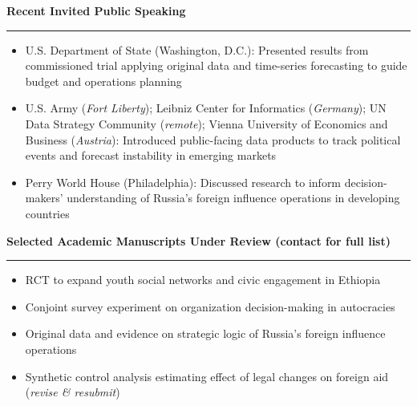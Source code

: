 \documentclass[11pt]{article}
\begin{document}

\textbf{\large Recent Invited Public Speaking}\\
\rule[3mm]{\textwidth}{.2pt}
\vspace{-25pt}
\begin{itemize} \itemsep -5pt
  \item U.S. Department of State (Washington, D.C.): Presented results from commissioned trial applying original data and time-series forecasting to guide budget and operations planning
  \item U.S. Army (\textit{Fort Liberty}); Leibniz Center for Informatics (\textit{Germany}); UN Data Strategy Community (\textit{remote}); Vienna University of Economics and Business (\textit{Austria}): Introduced public-facing data products to track political events and forecast instability in emerging markets
  \item Perry World House (Philadelphia): Discussed research to inform decision-makers' understanding of Russia's foreign influence operations in developing countries
\end{itemize}


\textbf{\large Selected Academic Manuscripts Under Review (contact for full list)}\\
\rule[3mm]{\textwidth}{.2pt}
\vspace{-25pt}
\begin{itemize} \itemsep -5pt
  \item RCT to expand youth social networks and civic engagement in Ethiopia
  \item Conjoint survey experiment on organization decision-making in autocracies
  \item Original data and evidence on strategic logic of Russia's foreign influence operations 
  \item Synthetic control analysis estimating effect of legal changes on foreign aid (\textit{revise \& resubmit})
\end{itemize}
\end{document}
